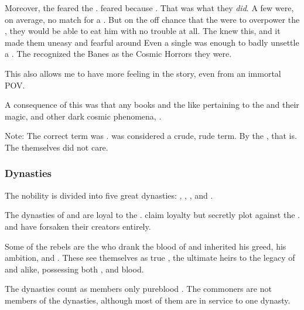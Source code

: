 Moreover, the \resphain feared the \banes. 
\Resphain feared \banes because . 
That was what they \emph{did}. 
A few \lesserbanes were, on average, no match for a \resphan. 
But on the off chance that the \banes were to overpower the \resphan, they would be able to eat him with no trouble at all. 
The \resphain knew this, and it made them uneasy and fearful around \banes 
Even a single \lesserbane was enough to badly unsettle a \resphan. 
The \resphain recognized the Banes as the Cosmic Horrors they were.

This also allows me to have more  feeling in the story, even from an immortal POV.

A consequence of this was that any books and the like pertaining to the \SitraAchras and their magic, and other dark cosmic phenomena, . 

Note: 
The correct term was . 
\quo{\Banelord} was considered a crude, rude term. 
By the \resphain, that is. 
The \banes themselves did not care. 





\subsubsection{Dynasties}
The \resphan{} nobility is divided into five great dynasties: 
\KiriathSepher, \TiphredSerah, \Mystraacht, \Kezerad{} and \Baelzerach. 

The dynasties of \KiriathSepher{} and \TiphredSerah{} are loyal to the \SitraAchras. 
\Mystraacht{} claim loyalty but secretly plot against the \SitraAchras. 
\Kezerad{} and \Baelzerach{} have forsaken their creators entirely. 

Some of the rebels are the \satharioth{} who drank the blood of \Nexagglachel{} and inherited his greed, his ambition, and . 
These \resphain{} see themselves as true \Miithians, the ultimate heirs to the legacy of \Miith{} and \Erebos{} alike, possessing both \nephilic, \draconic{} and \bane blood. 

The dynasties count as members only pureblood \resphain{}. 
The \ashenblooded{} commoners are not members of the dynasties, although most of them are in service to one dynasty. 





